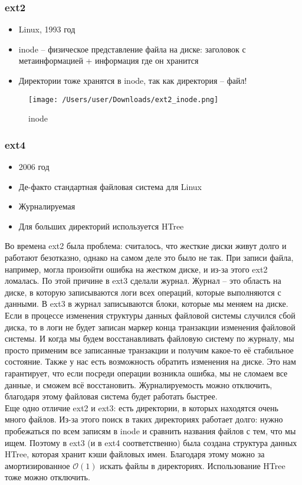   \subsubsection{ext2}
    \begin{itemize}
      \item Linux, 1993 год
      \item inode -- физическое представление файла на диске: заголовок с метаинформацией + информация где он хранится
      \item Директории тоже хранятся в inode, так как директория -- файл!
    \end{itemize}

\begin{figure}[H]
  \centering
  \texttt{[image: /Users/user/Downloads/ext2\_inode.png]}
  \caption{inode}
  \label{fig:inode}
\end{figure}  
  
  \subsubsection{ext4}
    \begin{itemize}
      \item 2006 год
      \item Де-факто стандартная файловая система для Linux
      \item Журналируемая
      \item Для больших директорий используется HTree
    \end{itemize}
  
    Во времена ext2 была проблема: считалось, что жесткие диски живут долго и работают безотказно, однако на самом деле это было не так. При записи файла, например, могла произойти ошибка на жестком диске, и из-за этого ext2 ломалась. По этой причине в ext3 сделали журнал. Журнал -- это область на диске, в которую записываются логи всех операций, которые выполняются с данными. В ext3 в журнал записываются блоки, которые мы меняем на диске. Если в процессе изменения структуры данных файловой системы случился сбой диска, то в логи не будет записан маркер конца транзакции изменения файловой системы. И когда мы будем восстанавливать файловую систему по журналу, мы просто применим все записанные транзакции и получим какое-то её стабильное состояние. Также у нас есть возможность обратить изменения на диске. Это нам гарантирует, что если посреди операции возникла ошибка, мы не сломаем все данные, и сможем всё восстановить. Журналируемость можно отключить, благодаря этому файловая система будет работать быстрее. \\
    Еще одно отличие ext2 и ext3: есть директории, в которых находятся очень много файлов. Из-за этого поиск в таких директориях работает долго: нужно пробежаться по всем записям в inode и сравнить названия файлов с тем, что мы ищем. Поэтому в ext3 (и в ext4 соответственно) была создана структура данных HTree, которая хранит кэши файловых имен. Благодаря этому можно за амортизированное $\mathcal{O}(1)$ искать файлы в директориях. Использование HTree тоже можно отключить.
    
